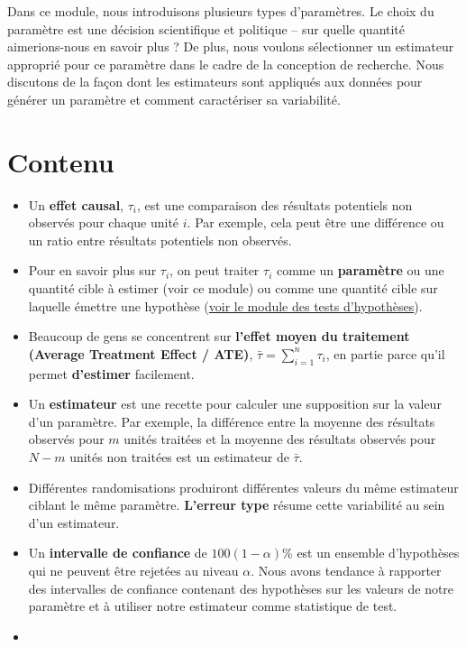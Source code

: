 \documentclass[12pt,]{book}
\begin{document}
Dans ce module, nous introduisons plusieurs types d'paramètres. Le choix du paramètre est une décision scientifique et politique -- sur quelle quantité aimerions-nous en savoir plus ? De plus, nous voulons sélectionner un estimateur approprié pour ce paramètre dans le cadre de la conception de recherche. Nous discutons de la façon dont les estimateurs sont appliqués aux données pour générer un paramètre et comment caractériser sa variabilité.

\hypertarget{contenu-4}{%
\section{Contenu}\label{contenu-4}}

\begin{itemize}
\item
  Un \textbf{effet causal}, \(\tau_i\), est une comparaison des résultats potentiels non observés pour chaque unité \(i\). Par exemple, cela peut être une différence ou un ratio entre résultats potentiels non observés.
\item
  Pour en savoir plus sur \(\tau_{i}\), on peut traiter \(\tau_{i}\) comme un \textbf{paramètre} ou une quantité cible à estimer (voir ce module)
  ou comme une quantité cible sur laquelle émettre une hypothèse (\href{tests-dhypothèses.html}{voir le module des tests d'hypothèses}).
\item
  Beaucoup de gens se concentrent sur \textbf{l'effet moyen du traitement (Average Treatment Effect / ATE)}, \(\bar{\tau}=\sum_{i=1}^n  \tau_{i}\), en partie parce qu'il permet \textbf{d'estimer} facilement.
\item
  Un \textbf{estimateur} est une recette pour calculer une supposition sur la valeur d'un paramètre. Par exemple, la différence entre la moyenne des résultats observés pour \(m\) unités traitées et la moyenne des résultats observés pour \(N-m\) unités non traitées est un estimateur de \(\bar{\tau}\).
\item
  Différentes randomisations produiront différentes valeurs du même estimateur ciblant le même paramètre. \textbf{L'erreur type} résume cette variabilité au sein d'un estimateur.
\item
  Un \textbf{intervalle de confiance} de \(100(1-\alpha)\)\% est un ensemble d'hypothèses qui ne peuvent être rejetées au niveau \(\alpha\). Nous avons tendance à rapporter des intervalles de confiance contenant des hypothèses sur les valeurs de notre paramètre et à utiliser notre estimateur comme statistique de test.
\item

\end{itemize}
\end{document}
